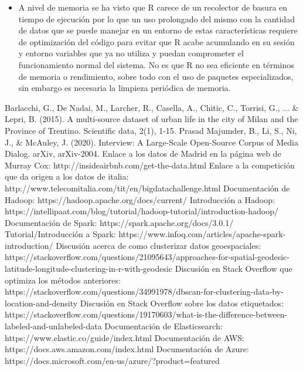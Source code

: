 \documentclass[11pt, a4paper]{article} %
\begin{document}
\begin{itemize}
\item A nivel de memoria se ha visto que R carece de un recolector de basura en tiempo de ejecución por lo que un uso prolongado del mismo con la cantidad de datos que se puede manejar en un entorno de estas características requiere de optimización del código para evitar que R acabe acumulando en su sesión y entorno variables que ya no utiliza y puedan comprometer el funcionamiento normal del sistema. No es que R no sea eficiente en términos de memoria o rendimiento, sobre todo con el uso de paquetes especializados, sin embargo es necesaria la limpieza periódica de memoria.
\end{itemize}
\newpage
\begin{thebibliography}{99}
 Barlacchi, G., De Nadai, M., Larcher, R., Casella, A., Chitic, C., Torrisi, G., ... & Lepri, B. (2015). A multi-source dataset of urban life in the city of Milan and the Province of Trentino. Scientific data, 2(1), 1-15.
 Prasad Majumder, B., Li, S., Ni, J., & McAuley, J. (2020). Interview: A Large-Scale Open-Source Corpus of Media Dialog. arXiv, arXiv-2004.
 Enlace a los datos de Madrid en la página web de Murray Cox: http://insideairbnb.com/get-the-data.html
 Enlace a la competición que da origen a los datos de italia: http://www.telecomitalia.com/tit/en/bigdatachallenge.html
 Documentación de Hadoop: https://hadoop.apache.org/docs/current/
 Introducción a Hadoop: https://intellipaat.com/blog/tutorial/hadoop-tutorial/introduction-hadoop/
 Documentación de Spark: https://spark.apache.org/docs/3.0.1/
 Tutorial/Introducción a Spark: https://www.infoq.com/articles/apache-spark-introduction/
 Discusión acerca de como clusterizar datos geoespaciales: https://stackoverflow.com/questions/21095643/approaches-for-spatial-geodesic-latitude-longitude-clustering-in-r-with-geodesic
 Discusión en Stack Overflow que optimiza los métodos anteriores: https://stackoverflow.com/questions/34991978/dbscan-for-clustering-data-by-location-and-density
 Discusión en Stack Overflow sobre los datos etiquetados: https://stackoverflow.com/questions/19170603/what-is-the-difference-between-labeled-and-unlabeled-data
 Documentación de Elasticsearch: https://www.elastic.co/guide/index.html
 Documentación de AWS: https://docs.aws.amazon.com/index.html
 Documentación de Azure: https://docs.microsoft.com/en-us/azure/?product=featured

\end{thebibliography}
\end{document}
